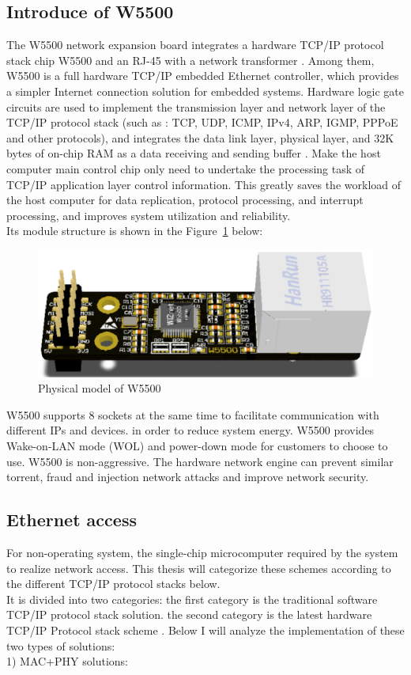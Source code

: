 \subsection{Introduce of W5500}
\label{sec:Introduce of W5500}
The W5500 network expansion board integrates a hardware TCP/IP protocol stack chip W5500 and an RJ-45 with a network transformer \cite{w5500datasheet}. Among them, W5500 is a full hardware TCP/IP embedded Ethernet controller, which provides a simpler Internet connection solution for embedded systems. Hardware logic gate circuits are used to implement the transmission layer and network layer of the TCP/IP protocol stack (such as : TCP, UDP, ICMP, IPv4, ARP, IGMP, PPPoE and other protocols), and integrates the data link layer, physical layer, and 32K bytes of on-chip RAM as a data receiving and sending buffer \cite{dunkels2001design}. Make the host computer main control chip only need to undertake the processing task of TCP/IP application layer control information. This greatly saves the workload of the host computer for data replication, protocol processing, and interrupt processing, and improves system utilization and reliability. 
\\
Its module structure is shown in the Figure~\ref{fig:2.6} below:
\\
\begin{figure}[h]
	\centering
	\includegraphics[width=15cm] {grafiken/2.6.eps}
	\caption{Physical model of W5500} 
	\label{fig:2.6}
\end{figure}
W5500 supports 8 sockets at the same time to facilitate communication with different IPs and devices. in order to reduce system energy. W5500 provides Wake-on-LAN mode (WOL) and power-down mode for customers to choose to use. W5500 is non-aggressive. The hardware network engine can prevent similar torrent, fraud and injection network attacks and improve network security.

\subsection{Ethernet access}
\label{sec:Ethernet access}
For non-operating system, the single-chip microcomputer required by the system to realize network access. This thesis will categorize these schemes according to the different TCP/IP protocol stacks below.
\\
It is divided into two categories: the first category is the traditional software TCP/IP protocol stack solution. the second category is the latest hardware TCP/IP
Protocol stack scheme \cite{mandke2007early}. Below I will analyze the implementation of these two types of solutions: 
\\
1) MAC+PHY solutions:

